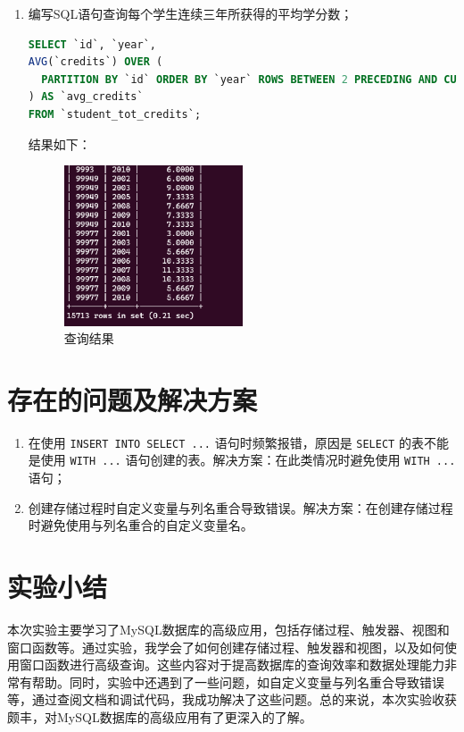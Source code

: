 \documentclass{article}
\begin{document}
\begin{enumerate}
\item 编写SQL语句查询每个学生连续三年所获得的平均学分数；

\begin{lstlisting}[language=sql]
SELECT `id`, `year`,
AVG(`credits`) OVER (
  PARTITION BY `id` ORDER BY `year` ROWS BETWEEN 2 PRECEDING AND CURRENT ROW
) AS `avg_credits`
FROM `student_tot_credits`;
\end{lstlisting}

结果如下：

\begin{figure}[H]
  \centering
  \includegraphics[width=0.5\textwidth]{img/43.png}
  \caption{查询结果}
\end{figure}

\end{enumerate}

\section{存在的问题及解决方案}

\begin{enumerate}
  \item 在使用 \texttt{INSERT INTO SELECT ...} 语句时频繁报错，原因是 \texttt{SELECT} 的表不能是使用 \texttt{WITH ...} 语句创建的表。解决方案：在此类情况时避免使用 \texttt{WITH ...} 语句；
  \item 创建存储过程时自定义变量与列名重合导致错误。解决方案：在创建存储过程时避免使用与列名重合的自定义变量名。
\end{enumerate}


\section{实验小结}

本次实验主要学习了MySQL数据库的高级应用，包括存储过程、触发器、视图和窗口函数等。通过实验，我学会了如何创建存储过程、触发器和视图，以及如何使用窗口函数进行高级查询。这些内容对于提高数据库的查询效率和数据处理能力非常有帮助。同时，实验中还遇到了一些问题，如自定义变量与列名重合导致错误等，通过查阅文档和调试代码，我成功解决了这些问题。总的来说，本次实验收获颇丰，对MySQL数据库的高级应用有了更深入的了解。
\end{document}
